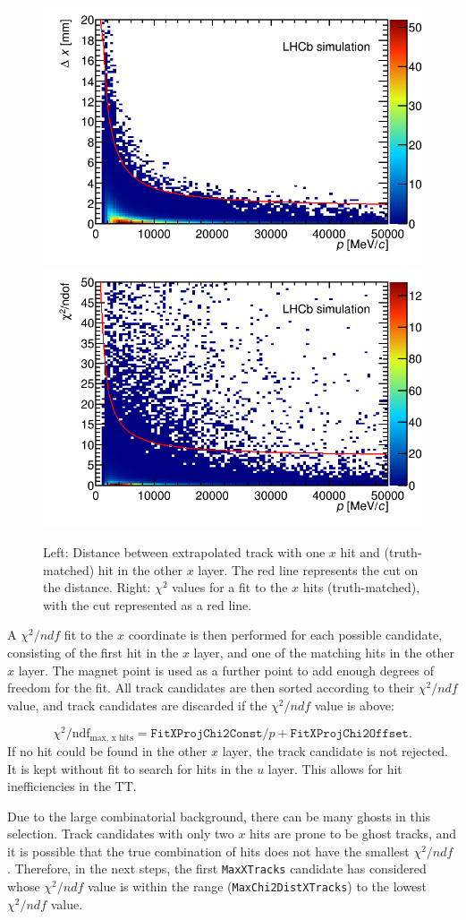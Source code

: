 \begin{figure}[!htbp]
 \begin{center}
  \includegraphics[width=0.49\linewidth]{figures/matchingDist1.png}
  \includegraphics[width=0.49\linewidth]{figures/xChi2Cut1.png}
   \caption{Left: Distance between extrapolated track with one $x$ hit and
   (truth-matched) hit in the other $x$ layer. The red line represents the cut
   on the distance. Right: $\chi^{2}$ values for a fit to the $x$ hits
   (truth-matched), with the cut represented as a red line.
     \label{fig:matchingDist}}
 \end{center}
\end{figure}


A $\chi^{2}/ndf$ fit to the $x$ coordinate is then performed for each possible candidate, consisting
of the first hit in the $x$ layer, and one of the matching hits in the other $x$
layer. The magnet point is used as a further point to add enough degrees of freedom for the fit. All track candidates are then sorted according to their
$\chi^{2}/ndf$  value, and track candidates are discarded if the $\chi^{2}/ndf$  value is
above:

\begin{equation}
\chi^{2}/\text{ndf}_{\text{max, x hits}} =  \texttt{FitXProjChi2Const} / p + \texttt{FitXProjChi2Offset}.
\end{equation}
If no hit could be found in the other $x$ layer, the track candidate is not rejected. 
It is kept without fit to search for hits in the $u$ layer. This allows for hit inefficiencies in the TT.

Due to the large combinatorial background, there can be many ghosts in this selection.
Track candidates with only two $x$ hits are prone to be ghost tracks, and it is possible that the true combination of hits does not have the smallest $\chi^{2}/ndf$ .
Therefore, in the next steps, the first \texttt{MaxXTracks} candidate has considered whose $\chi^{2}/ndf$  value is within the range
(\texttt{MaxChi2DistXTracks}) to the lowest $\chi^{2}/ndf$  value.

